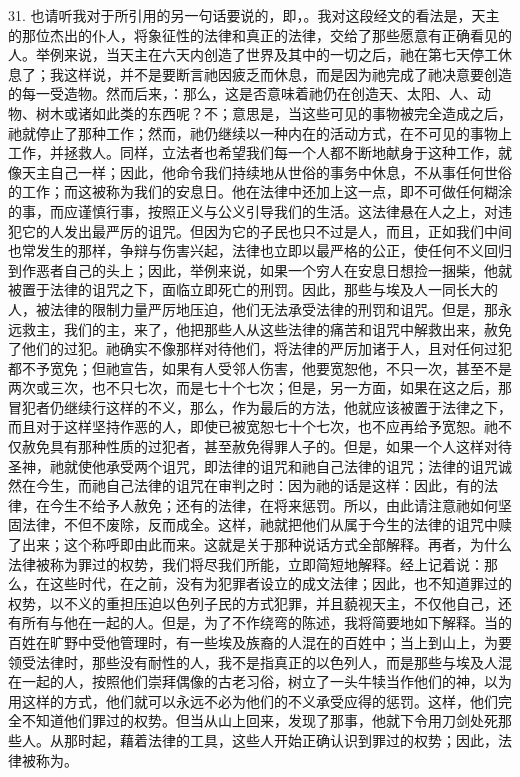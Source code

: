 31. 也请听我对于所引用的另一句话要说的，即，。我对这段经文的看法是，天主的那位杰出的仆人，将象征性的法律和真正的法律，交给了那些愿意有正确看见的人。举例来说，当天主在六天内创造了世界及其中的一切之后，祂在第七天停工休息了；我这样说，并不是要断言祂因疲乏而休息，而是因为祂完成了祂决意要创造的每一受造物。然而后来，：那么，这是否意味着祂仍在创造天、太阳、人、动物、树木或诸如此类的东西呢？不；意思是，当这些可见的事物被完全造成之后，祂就停止了那种工作；然而，祂仍继续以一种内在的活动方式，在不可见的事物上工作，并拯救人。同样，立法者也希望我们每一个人都不断地献身于这种工作，就像天主自己一样；因此，他命令我们持续地从世俗的事务中休息，不从事任何世俗的工作；而这被称为我们的安息日。他在法律中还加上这一点，即不可做任何糊涂的事，而应谨慎行事，按照正义与公义引导我们的生活。这法律悬在人之上，对违犯它的人发出最严厉的诅咒。但因为它的子民也只不过是人，而且，正如我们中间也常发生的那样，争辩与伤害兴起，法律也立即以最严格的公正，使任何不义回归到作恶者自己的头上；因此，举例来说，如果一个穷人在安息日想捡一捆柴，他就被置于法律的诅咒之下，面临立即死亡的刑罚。因此，那些与埃及人一同长大的人，被法律的限制力量严厉地压迫，他们无法承受法律的刑罚和诅咒。但是，那永远救主，我们的主，来了，他把那些人从这些法律的痛苦和诅咒中解救出来，赦免了他们的过犯。祂确实不像那样对待他们，将法律的严厉加诸于人，且对任何过犯都不予宽免；但祂宣告，如果有人受邻人伤害，他要宽恕他，不只一次，甚至不是两次或三次，也不只七次，而是七十个七次；但是，另一方面，如果在这之后，那冒犯者仍继续行这样的不义，那么，作为最后的方法，他就应该被置于法律之下，而且对于这样坚持作恶的人，即使已被宽恕七十个七次，也不应再给予宽恕。祂不仅赦免具有那种性质的过犯者，甚至赦免得罪人子的。但是，如果一个人这样对待圣神，祂就使他承受两个诅咒，即法律的诅咒和祂自己法律的诅咒；法律的诅咒诚然在今生，而祂自己法律的诅咒在审判之时：因为祂的话是这样：因此，有的法律，在今生不给予人赦免；还有的法律，在将来惩罚。所以，由此请注意祂如何坚固法律，不但不废除，反而成全。这样，祂就把他们从属于今生的法律的诅咒中赎了出来；这个称呼即由此而来。这就是关于那种说话方式全部解释。再者，为什么法律被称为罪过的权势，我们将尽我们所能，立即简短地解释。经上记着说：那么，在这些时代，在之前，没有为犯罪者设立的成文法律；因此，也不知道罪过的权势，以不义的重担压迫以色列子民的方式犯罪，并且藐视天主，不仅他自己，还有所有与他在一起的人。但是，为了不作绕弯的陈述，我将简要地如下解释。当的百姓在旷野中受他管理时，有一些埃及族裔的人混在的百姓中；当上到山上，为要领受法律时，那些没有耐性的人，我不是指真正的以色列人，而是那些与埃及人混在一起的人，按照他们崇拜偶像的古老习俗，树立了一头牛犊当作他们的神，以为用这样的方式，他们就可以永远不必为他们的不义承受应得的惩罚。这样，他们完全不知道他们罪过的权势。但当从山上回来，发现了那事，他就下令用刀剑处死那些人。从那时起，藉着法律的工具，这些人开始正确认识到罪过的权势；因此，法律被称为。\par

